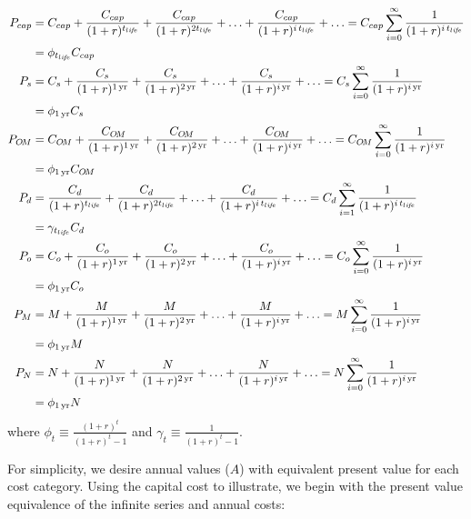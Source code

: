 \begin{align} \label{eq:present_values}
\footnotesize{}
  P_{cap} &= C_{cap} + \frac{C_{cap}}{(1 + r)^{\tlife}} + \frac{C_{cap}}{(1 + r)^{2 \tlife}} +
             \ldots + \frac{C_{cap}}{(1 + r)^{\itlife}} + \ldots 
           = C_{cap} \sum_{i = 0}^{\infty} \frac{1}{(1 + r)^{\itlife}} \nonumber \\
          &= \phi_{\tlife} C_{cap} \\
%
  P_s &= C_s + \frac{C_s}{(1 + r)^{\oneyr}} + \frac{C_s}{(1 + r)^{\twoyr}} + 
         \ldots + \frac{C_s}{(1 + r)^{\iyr}} + \ldots 
       = C_s \sum_{i = 0}^{\infty} \frac{1}{(1 + r)^{\iyr}} \nonumber \\
      &= \phi_{\oneyr} C_s \\
%
  P_{\om} &= C_{\om} + \frac{C_{\om}}{(1 + r)^{\oneyr}} + \frac{C_{\om}}{(1 + r)^{\twoyr}} + 
             \ldots + \frac{C_{\om}}{(1 + r)^{\iyr}} + \ldots 
           = C_{\om} \sum_{i = 0}^{\infty} \frac{1}{(1 + r)^{\iyr}} \nonumber \\
          &= \phi_{\oneyr} C_{\om} \\
%
  P_d &= \frac{C_d}{(1 + r)^{\tlife}} + \frac{C_d}{(1 + r)^{2 \tlife}} + 
         \ldots + \frac{C_d}{(1 + r)^{\itlife}} + \ldots 
       = C_d \sum_{i = 1}^{\infty} \frac{1}{(1 + r)^{\itlife}} \nonumber \\
      &= \gamma_{\tlife} C_d \\
%
  P_o &= C_o + \frac{C_o}{(1 + r)^{\oneyr}} + \frac{C_o}{(1 + r)^{\twoyr}} + 
         \ldots + \frac{C_o}{(1 + r)^{\iyr}} + \ldots 
       = C_o \sum_{i = 0}^{\infty} \frac{1}{(1 + r)^{\iyr}} \nonumber \\
      &= \phi_{\oneyr} C_o \\
%
  P_M &= M + \frac{M}{(1 + r)^{\oneyr}} + \frac{M}{(1 + r)^{\twoyr}} + 
         \ldots + \frac{M}{(1 + r)^{\iyr}} + \ldots
       = M \sum_{i = 0}^{\infty} \frac{1}{(1 + r)^{\iyr}} \nonumber \\
      &= \phi_{\oneyr} M \\
%
  P_N &= N + \frac{N}{(1 + r)^{\oneyr}} + \frac{N}{(1 + r)^{\twoyr}} + 
         \ldots + \frac{N}{(1 + r)^{\iyr}} + \ldots
       = N \sum_{i = 0}^{\infty} \frac{1}{(1 + r)^{\iyr}} \nonumber \\
      &= \phi_{\oneyr} N
\end{align}
%
where $\phi_t \equiv \frac{(1 + r)^t}{(1 + r)^t - 1}$
and $\gamma_t \equiv \frac{1}{(1 + r)^t - 1}$.

For simplicity, we desire annual values ($A$)
with equivalent present value for each cost category. 
Using the capital cost to illustrate, 
we begin with the present value equivalence of the infinite series and 
annual costs:

